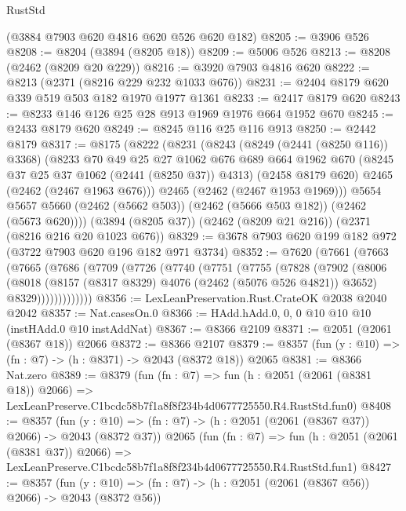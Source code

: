 \begin{lexlean}{RustStd}
\begin{coremodule}
    (@3884 @7903 @620 @4816 @620 @526 @620 @182)
@8205 := @3906 @526
@8208 := @8204 (@3894 (@8205 @18))
@8209 := @5006 @526
@8213 := @8208 (@2462 (@8209 @20 @229))
@8216 := @3920 @7903 @4816 @620
@8222 := @8213 (@2371 (@8216 @229 @232 @1033 @676))
@8231 := @2404 @8179 @620 @339 @519 @503 @182 @1970 @1977 @1361
@8233 := @2417 @8179 @620
@8243 := @8233 @146 @126 @25 @28 @913 @1969 @1976 @664 @1952 @670
@8245 := @2433 @8179 @620
@8249 := @8245 @116 @25 @116 @913
@8250 := @2442 @8179
@8317 := @8175
    (@8222
      (@8231
        (@8243
          (@8249 (@2441 (@8250 @116)) @3368)
          (@8233
            @70
            @49
            @25
            @27
            @1062
            @676
            @689
            @664
            @1962
            @670
            (@8245 @37 @25 @37 @1062 (@2441 (@8250 @37)) @4313)
            (@2458 @8179 @620)
            @2465
            (@2462 (@2467 @1963 @676)))
          @2465
          (@2462 (@2467 @1953 @1969)))
        @5654
        @5657
        @5660
        (@2462 (@5662 @503))
        (@2462 (@5666 @503 @182))
        (@2462 (@5673 @620))))
    (@3894 (@8205 @37))
    (@2462 (@8209 @21 @216))
    (@2371 (@8216 @216 @20 @1023 @676))
@8329 := @3678 @7903 @620 @199 @182 @972 (@3722 @7903 @620 @196 @182 @971 @3734)
@8352 := @7620
    (@7661
      (@7663
        (@7665
          (@7686
            (@7709
              (@7726
                (@7740
                  (@7751
                    (@7755
                      (@7828
                        (@7902
                          (@8006
                            (@8018
                              (@8157 (@8317 @8329) @4076 (@2462 (@5076 @526 @4821)) @3652)
                              @8329)))))))))))))
@8356 := LexLeanPreservation.Rust.CrateOK @2038 @2040 @2042
@8357 := Nat.casesOn.{0}
@8366 := HAdd.hAdd.{0, 0, 0} @10 @10 @10 (instHAdd.{0} @10 instAddNat)
@8367 := @8366 @2109
@8371 := @2051 (@2061 (@8367 @18)) @2066
@8372 := @8366 @2107
@8379 := @8357 (fun (y : @10) => (fn : @7) -> (h : @8371) -> @2043 (@8372 @18)) @2065
@8381 := @8366 Nat.zero
@8389 := @8379
    (fun (fn : @7) =>
    fun (h : @2051 (@2061 (@8381 @18)) @2066) =>
    LexLeanPreserve.C1bcdc58b7f1a8f8f234b4d0677725550.R4.RustStd.fun0)
@8408 := @8357
    (fun (y : @10) => (fn : @7) -> (h : @2051 (@2061 (@8367 @37)) @2066) -> @2043 (@8372 @37))
    @2065
    (fun (fn : @7) =>
    fun (h : @2051 (@2061 (@8381 @37)) @2066) =>
    LexLeanPreserve.C1bcdc58b7f1a8f8f234b4d0677725550.R4.RustStd.fun1)
@8427 := @8357
    (fun (y : @10) => (fn : @7) -> (h : @2051 (@2061 (@8367 @56)) @2066) -> @2043 (@8372 @56))

\end{coremodule}
\end{lexlean}
